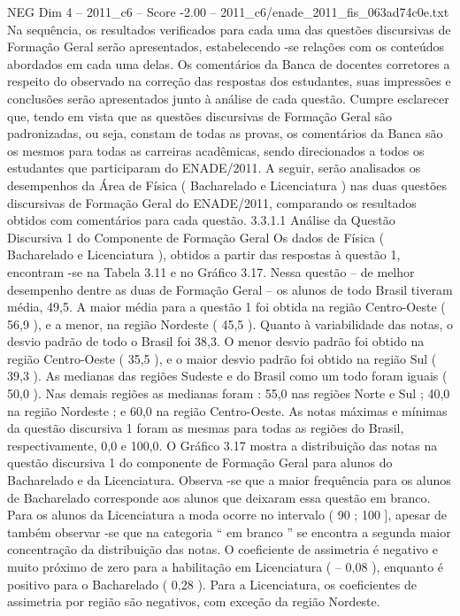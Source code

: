 \begin{textsample}{NEG Dim 4 – 2011\_c6 – Score -2.00 – 2011\_c6/enade\_2011\_fis\_063ad74c0e.txt}
Na sequência, os resultados verificados para cada uma das questões discursivas de Formação Geral serão apresentados, estabelecendo -se relações com os conteúdos abordados em cada uma delas.
Os comentários da Banca de docentes corretores a respeito do observado na correção das respostas dos estudantes, suas impressões e conclusões serão apresentados junto à análise de cada questão.
Cumpre esclarecer que, tendo em vista que as questões discursivas de Formação Geral são padronizadas, ou seja, constam de todas as provas, os comentários da Banca são os mesmos para todas as carreiras acadêmicas, sendo direcionados a todos os estudantes que participaram do ENADE/2011.
A seguir, serão analisados os desempenhos da Área de Física ( Bacharelado e Licenciatura ) nas duas questões discursivas de Formação Geral do ENADE/2011, comparando os resultados obtidos com comentários para cada questão. 3.3.1.1 Análise da Questão Discursiva 1 do Componente de Formação Geral Os dados de Física ( Bacharelado e Licenciatura ), obtidos a partir das respostas à questão 1, encontram -se na Tabela 3.11 e no Gráfico 3.17.
Nessa questão – de melhor desempenho dentre as duas de Formação Geral – os alunos de todo Brasil tiveram média, 49,5.
A maior média para a questão 1 foi obtida na região Centro-Oeste ( 56,9 ), e a menor, na região Nordeste ( 45,5 ).
Quanto à variabilidade das notas, o desvio padrão de todo o Brasil foi 38,3.
O menor desvio padrão foi obtido na região Centro-Oeste ( 35,5 ), e o maior desvio padrão foi obtido na região Sul ( 39,3 ).
As medianas das regiões Sudeste e do Brasil como um todo foram iguais ( 50,0 ).
Nas demais regiões as medianas foram : 55,0 nas regiões Norte e Sul ; 40,0 na região Nordeste ; e 60,0 na região Centro-Oeste.
As notas máximas e mínimas da questão discursiva 1 foram as mesmas para todas as regiões do Brasil, respectivamente, 0,0 e 100,0.
O Gráfico 3.17 mostra a distribuição das notas na questão discursiva 1 do componente de Formação Geral para alunos do Bacharelado e da Licenciatura.
Observa -se que a maior frequência para os alunos de Bacharelado corresponde aos alunos que deixaram essa questão em branco.
Para os alunos da Licenciatura a moda ocorre no intervalo ( 90 ; 100 ], apesar de também observar -se que na categoria “ em branco ” se encontra a segunda maior concentração da distribuição das notas.
O coeficiente de assimetria é negativo e muito próximo de zero para a habilitação em Licenciatura ( – 0,08 ), enquanto é positivo para o Bacharelado ( 0,28 ).
Para a Licenciatura, os coeficientes de assimetria por região são negativos, com exceção da região Nordeste.

\end{textsample}
